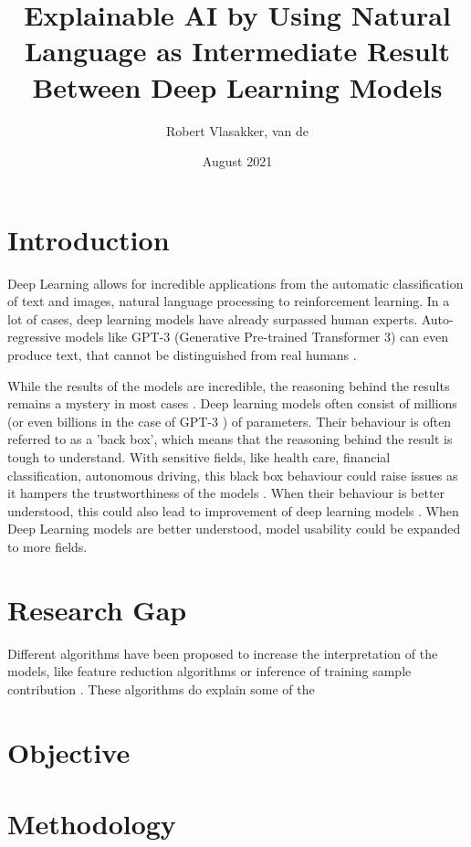 \documentclass{article}
\title{Explainable AI by Using Natural Language as Intermediate Result Between Deep Learning Models}
\author{Robert Vlasakker, van de}
\date{August 2021}
\begin{document}
\maketitle

\section{Introduction}

Deep Learning allows for incredible applications from the automatic classification of text and images, natural language processing to reinforcement learning.
In a lot of cases, deep learning models have already surpassed human experts.
Auto-regressive models like GPT-3 (Generative Pre-trained Transformer 3) can even produce text, that cannot be distinguished from real humans \cite{brown_language_2020}.


While the results of the models are incredible, the reasoning behind the results remains a mystery in most cases \cite{li_interpretable_2021}.
Deep learning models often consist of millions (or even billions in the case of GPT-3 \cite{brown_language_2020}) of parameters. 
Their behaviour is often referred to as a 'back box', which means that the reasoning behind the result is tough to understand.
With sensitive fields, like health care, financial classification, autonomous driving, this black box behaviour could raise issues as it hampers the trustworthiness of the models \cite{carvalho_machine_2019}.
When their behaviour is better understood, this could also lead to improvement of deep learning models \cite{amershi_modeltracker_2015}.
When Deep Learning models are better understood, model usability could be expanded to more fields.




\section{Research Gap}
Different algorithms have been proposed to increase the interpretation of the models, like feature reduction algorithms \cite{ribeiro_why_2016} or inference of training sample contribution \cite{koh_understanding_2020}.
These algorithms do explain some of the 

\section{Objective}


\section{Methodology}
\end{document}
